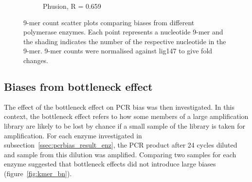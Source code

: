 \documentclass[parskip=full, numbers=noenddot]{scrreprt}
\begin{document}
\begin{figure}[htb]
\begin{subfigure}[htb]{0.5\textwidth}
    \caption{Phusion, R = 0.659}
    \label{fig:kmer_enz_phusion}
  \end{subfigure}
  \caption{9-mer count scatter plots comparing biases from different polymerase enzymes.  Each point represents a nucleotide 9-mer and the shading indicates the number of the respective nucleotide in the 9-mer.  9-mer counts were normalised against lig147 to give fold changes.}
  \label{fig:kmer_enz}
\end{figure}

\subsection{Biases from bottleneck effect}
\label{ssec:pcrbias_result_bn}

The effect of the bottleneck effect on PCR bias was then investigated.  In this context, the bottleneck effect refers to how some members of a large amplification library are likely to be lost by chance if a small sample of the library is taken for amplification.  For each enzyme investigated in subsection~\ref{ssec:pcrbias_result_enz}, the PCR product after 24 cycles diluted and sample from this dilution was amplified.  Comparing two samples for each enzyme suggested that bottleneck effects did not introduce large biases (figure~\ref{fig:kmer_bn}).
\end{document}
